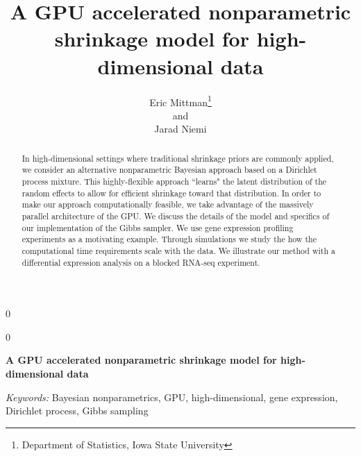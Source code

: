 \documentclass[12pt]{article}
\newcommand{\blind}{0}
\begin{document}
\newtoggle{thesis}
\togglefalse{thesis}

%

\def\spacingset#1{\renewcommand{\baselinestretch}%
{#1}\small\normalsize} \spacingset{1}
  
  
    
    \blind
  {
    \title{\bf A GPU accelerated nonparametric shrinkage model for high-dimensional data}
    \author{Eric Mittman\thanks{Department of Statistics, Iowa State University}\\
    and\\
    Jarad Niemi\footnotemark[1]}
      
      
    \maketitle
  } \fi
  
  \blind
  {
    \bigskip
    \bigskip
    \bigskip
    \begin{center}
    {\LARGE\bf A GPU accelerated nonparametric shrinkage model for high-dimensional data}
    \end{center}
    \medskip
  } \fi
  
  \bigskip
  \begin{abstract}
  In high-dimensional settings where traditional shrinkage priors are commonly applied, we consider an alternative nonparametric Bayesian approach based on a Dirichlet process mixture. This highly-flexible approach ``learns" the latent distribution of the random effects to allow for efficient shrinkage toward that distribution. In order to make our approach computationally feasible, we take advantage of the massively parallel architecture of the GPU. We discuss the details of the model and specifics of our implementation of the Gibbs sampler. We use gene expression profiling experiments as a motivating example. Through simulations we study the how the computational time requirements scale with the data. We illustrate our method with a differential expression analysis on a blocked RNA-seq experiment.
  \end{abstract}
  
  \noindent%
  {\it Keywords:}  Bayesian nonparametrics, GPU, high-dimensional, gene expression, Dirichlet process, Gibbs sampling
  
  \spacingset{1.45}
  
  
\end{document}
